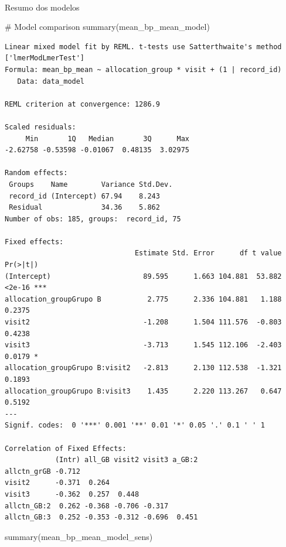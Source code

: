 \documentclass[
  12pt,
]{article}
\makeatletter
\let\oldparagraph\paragraph
\renewcommand{\paragraph}{
    \@ifstar
      \xxxParagraphStar
      \xxxParagraphNoStar
  }
\newcommand{\xxxParagraphStar}[1]{\oldparagraph*{#1}\mbox{}}
\newcommand{\xxxParagraphNoStar}[1]{\oldparagraph{#1}\mbox{}}
\newenvironment{Shaded}{\begin{snugshade}}{\end{snugshade}}
\newcommand{\CommentTok}[1]{\textcolor[rgb]{0.37,0.37,0.37}{#1}}
\newcommand{\FunctionTok}[1]{\textcolor[rgb]{0.28,0.35,0.67}{#1}}
\newcommand{\NormalTok}[1]{\textcolor[rgb]{0.00,0.23,0.31}{#1}}
\makeatother
\begin{document}
\paragraph{Resumo dos modelos}\label{resumo-dos-modelos-15}

\begin{Shaded}
\begin{Highlighting}[]
\CommentTok{\# Model comparison}
\FunctionTok{summary}\NormalTok{(mean\_bp\_mean\_model)}
\end{Highlighting}
\end{Shaded}

\begin{verbatim}
Linear mixed model fit by REML. t-tests use Satterthwaite's method ['lmerModLmerTest']
Formula: mean_bp_mean ~ allocation_group * visit + (1 | record_id)
   Data: data_model

REML criterion at convergence: 1286.9

Scaled residuals: 
     Min       1Q   Median       3Q      Max 
-2.62758 -0.53598 -0.01067  0.48135  3.02975 

Random effects:
 Groups    Name        Variance Std.Dev.
 record_id (Intercept) 67.94    8.243   
 Residual              34.36    5.862   
Number of obs: 185, groups:  record_id, 75

Fixed effects:
                               Estimate Std. Error      df t value Pr(>|t|)    
(Intercept)                      89.595      1.663 104.881  53.882   <2e-16 ***
allocation_groupGrupo B           2.775      2.336 104.881   1.188   0.2375    
visit2                           -1.208      1.504 111.576  -0.803   0.4238    
visit3                           -3.713      1.545 112.106  -2.403   0.0179 *  
allocation_groupGrupo B:visit2   -2.813      2.130 112.538  -1.321   0.1893    
allocation_groupGrupo B:visit3    1.435      2.220 113.267   0.647   0.5192    
---
Signif. codes:  0 '***' 0.001 '**' 0.01 '*' 0.05 '.' 0.1 ' ' 1

Correlation of Fixed Effects:
            (Intr) all_GB visit2 visit3 a_GB:2
allctn_grGB -0.712                            
visit2      -0.371  0.264                     
visit3      -0.362  0.257  0.448              
allctn_GB:2  0.262 -0.368 -0.706 -0.317       
allctn_GB:3  0.252 -0.353 -0.312 -0.696  0.451
\end{verbatim}

\begin{Shaded}
\begin{Highlighting}[]
\FunctionTok{summary}\NormalTok{(mean\_bp\_mean\_model\_sens)}
\end{Highlighting}
\end{Shaded}
\end{document}
